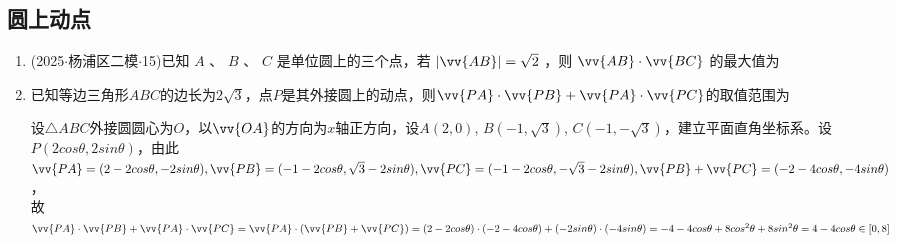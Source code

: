 \subsection*{圆上动点}
\begin{enumerate}
    \item (2025$\cdot$杨浦区二模$\cdot$15)已知 $A$ 、 $B$ 、 $C$ 是单位圆上的三个点，若 $\left| \vv{AB}\right|  = \sqrt{2}$ ，则 $\vv{AB} \cdot \vv{BC}$ 的最大值为 

    \item 已知等边三角形$ABC$的边长为$2\sqrt{3}$，点$P$是其外接圆上的动点，则$\vv{PA} \cdot \vv{PB} + \vv{PA} \cdot \vv{PC}$的取值范围为\blkda{$[0, 8]$}
    \begin{jieda}
        设$\triangle ABC$外接圆圆心为$O$，以$\vv{OA}$的方向为$x$轴正方向，设$A(2, 0)$, $B(-1, \sqrt{3})$, $C(-1, -\sqrt{3})$，建立平面直角坐标系。设$P(2cos\theta, 2sin\theta)$，由此\\
        $\vv{PA} = (2-2cos\theta, -2sin\theta), \vv{PB} = (-1-2cos\theta, \sqrt{3}-2sin\theta), \\
        \vv{PC} = (-1-2cos\theta, -\sqrt{3}-2sin\theta), \vv{PB} + \vv{PC} = (-2-4cos\theta, -4sin\theta)$，\\
        故$\vv{PA} \cdot \vv{PB} + \vv{PA} \cdot \vv{PC} = \vv{PA} \cdot (\vv{PB}+\vv{PC}) = (2-2cos\theta) \cdot (-2-4cos\theta) + (-2sin\theta) \cdot (-4sin\theta) = -4 - 4cos\theta + 8cos^2\theta + 8sin^2\theta = 4 - 4cos\theta \in [0, 8]$
    \end{jieda}
\end{enumerate}

